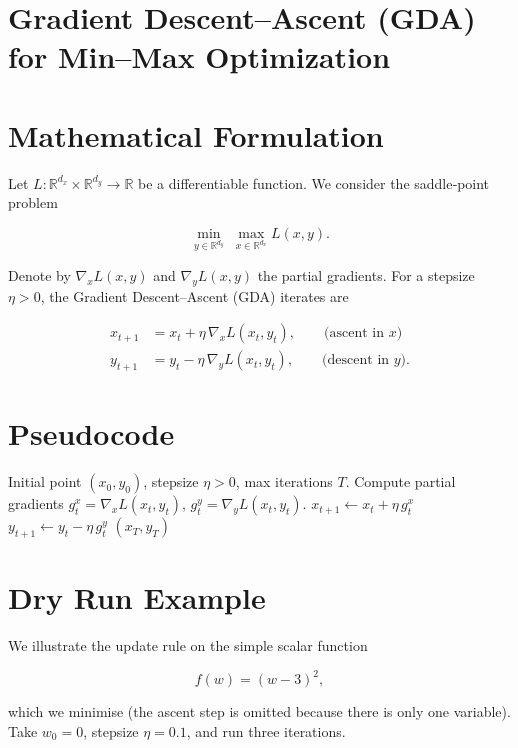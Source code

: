 \documentclass{article}
\begin{document}
\section*{Gradient Descent--Ascent (GDA) for Min–Max Optimization}

\section*{Mathematical Formulation}
Let $L:\mathbb{R}^{d_x}\times\mathbb{R}^{d_y}\rightarrow\mathbb{R}$ be a differentiable function.  
We consider the saddle‑point problem  

\[
\min_{y\in\mathbb{R}^{d_y}}\;\max_{x\in\mathbb{R}^{d_x}} L(x,y).
\]

Denote by $\nabla_x L(x,y)$ and $\nabla_y L(x,y)$ the partial gradients.  
For a stepsize $\eta>0$, the Gradient Descent–Ascent (GDA) iterates are  

\[
\boxed{
\begin{aligned}
x_{t+1} &= x_t + \eta \,\nabla_x L(x_t,y_t), \qquad\text{(ascent in $x$)}\\[0.2em]
y_{t+1} &= y_t - \eta \,\nabla_y L(x_t,y_t), \qquad\text{(descent in $y$)} .
\end{aligned}}
\tag{1}
\]

\section*{Pseudocode}
\begin{algorithm}[H]
\caption{Gradient Descent–Ascent (GDA)}\label{alg:GDA}
\begin{algorithmic}[1]
\Require Initial point $(x_0,y_0)$, stepsize $\eta>0$, max iterations $T$.
    \State Compute partial gradients $g^x_t=\nabla_x L(x_t,y_t)$,
          $g^y_t=\nabla_y L(x_t,y_t)$.
    \State $x_{t+1}\gets x_t+\eta\, g^x_t$   
    \State $y_{t+1}\gets y_t-\eta\, g^y_t$   
\EndFor
\State \Return $(x_T,y_T)$
\end{algorithmic}
\end{algorithm}

\section*{Dry Run Example}
We illustrate the update rule on the simple scalar function  

\[
f(w)= (w-3)^2,
\]

which we minimise (the ascent step is omitted because there is only one variable).  
Take $w_0=0$, stepsize $\eta=0.1$, and run three iterations.
\end{document}

